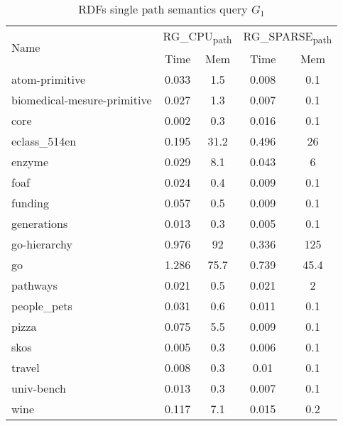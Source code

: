 {\setlength{\tabcolsep}{0.4em}
\begin{table*}[h]
\caption{RDFs single path semantics query $G_1$}
\label{tbl:tableRDFSinglePathIndexQ1}
\begin{tabular}{| l | c  c | c  c |}
    \hline
    \multirow{2}{*}{Name}	&	\multicolumn{2}{|c|}{RG\_CPU\textsubscript{path}}	&	\multicolumn{2}{|c|}{RG\_SPARSE\textsubscript{path}}	 \\
    		& Time & Mem &  Time     & Mem   \\    
    \hline
    \hline
    atom-primitive          & 0.033 & 1.5  & 0.008 & 0.1   \\
biomedical-mesure-primitive & 0.027 & 1.3  & 0.007 & 0.1   \\
core                        & 0.002 & 0.3  & 0.016 & 0.1   \\
eclass\_514en               & 0.195 & 31.2 & 0.496 & 26    \\
enzyme                      & 0.029 & 8.1  & 0.043 & 6     \\
foaf                        & 0.024 & 0.4  & 0.009 & 0.1   \\
funding                     & 0.057 & 0.5  & 0.009 & 0.1   \\
generations                 & 0.013 & 0.3  & 0.005 & 0.1   \\
go-hierarchy                & 0.976 & 92   & 0.336 & 125   \\
go                          & 1.286 & 75.7 & 0.739 & 45.4  \\
pathways                    & 0.021 & 0.5  & 0.021 & 2     \\
people\_pets                & 0.031 & 0.6  & 0.011 & 0.1   \\
pizza                       & 0.075 & 5.5  & 0.009 & 0.1   \\
skos                        & 0.005 & 0.3  & 0.006 & 0.1   \\
travel                      & 0.008 & 0.3  & 0.01  & 0.1   \\
univ-bench                  & 0.013 & 0.3  & 0.007 & 0.1   \\
wine                        & 0.117 & 7.1  & 0.015 & 0.2   \\
    \hline
  \end{tabular}
\end{table*}
}

